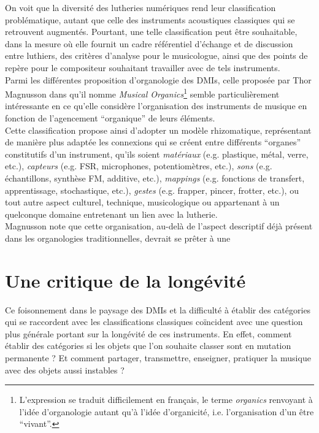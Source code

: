 \noindent On voit que la diversité des lutheries numériques rend leur classification problématique, autant que celle des instruments acoustiques classiques qui se retrouvent augmentés. Pourtant, une telle classification peut être souhaitable, dans la mesure où elle fournit un cadre référentiel d'échange et de discussion entre luthiers, des critères d'analyse pour le musicologue, ainsi que des points de repère pour le compositeur souhaitant travailler avec de tels instruments. \\
\indent Parmi les différentes proposition d'organologie des \glspl{DMI}, celle proposée par Thor Magnusson dans \cite{magnusson_musical_2017} qu'il nomme \textit{Musical Organics}\footnote{L'expression se traduit difficilement en français, le terme \textit{organics} renvoyant à l'idée d'organologie autant qu'à l'idée d'organicité, i.e. l'organisation d'un être ``vivant''.} semble particulièrement intéressante en ce qu'elle considère l'organisation des instruments de musique en fonction de l'agencement ``organique'' de leurs éléments.\\
\indent Cette classification propose ainsi d'adopter un modèle rhizomatique, représentant de manière plus adaptée les connexions qui se créent entre différents ``organes'' constitutifs d'un instrument, qu'ils soient \textit{matériaux} (e.g. plastique, métal, verre, etc.), \textit{capteurs} (e.g. \gls{FSR}, microphones, potentiomètres, etc.), \textit{sons} (e.g. échantillons, synthèse FM, additive, etc.), \textit{\glspl{mapping}} (e.g. fonctions de transfert, apprentissage, stochastique, etc.), \textit{gestes} (e.g. frapper, pincer, frotter, etc.), ou tout autre aspect culturel, technique, musicologique ou appartenant à un quelconque domaine entretenant un lien avec la lutherie.\\
\indent Magnusson note que cette organisation, au-delà de l'aspect descriptif déjà présent dans les organologies traditionnelles, devrait se prêter à une 

\section{Une critique de la longévité}
\label{sec:ephemerality:critique}

\noindent Ce foisonnement dans le paysage des \glspl{DMI} et la difficulté à établir des catégories qui se raccordent avec les classifications classiques coïncident avec une question plus générale portant sur la longévité de ces instruments. En effet, comment établir des catégories si les objets que l'on souhaite classer sont en mutation permanente ? Et comment partager, transmettre, enseigner, pratiquer la musique avec des objets aussi instables ?


